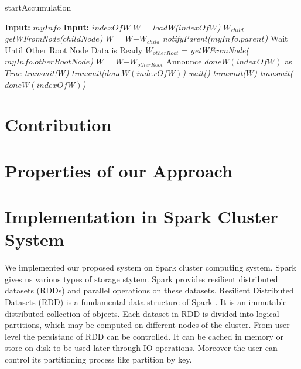 \documentclass[10pt,conference,letterpaper]{IEEEtran}
\begin{document}
\begin{algorithm} [!htbp]
\label{accum}
\caption{startAccumulation}
	\begin{algorithmic}[1]
	\State \textbf{Input:} $myInfo$
	\State \textbf{Input:} $indexOfW$
	\State $W$ = \textit{loadW($indexOfW$)} 
			\State  $W_{child}$ = \textit{getWFromNode($childNode$)}
			\State $W$ = $W$+$W_{child}$
		\EndIf
	\EndFor
	\State \textit{notifyParent($myInfo.parent$)}
		\State Wait Until Other Root Node Data is Ready
		\State  $W_{otherRoot}$ = \textit{getWFromNode($myInfo.otherRootNode$)}
		\State $W$ = $W$+$W_{otherRoot}$
		\State Announce $doneW(indexOfW)$ as $True$
			\State \textit{transmit($W$)}
			\State \textit{transmit($doneW(indexOfW)$)}
		\EndFor
	\Else
			\State \textit{wait()}
		\EndWhile
			\State \textit{transmit($W$)}
			\State \textit{transmit($doneW(indexOfW)$)}
		\EndFor
	\EndIf
	
	\end{algorithmic}
\end{algorithm}


\newpage

\section{Contribution}

\section{Properties of our Approach}

\section{Implementation in Spark Cluster System}
We implemented our proposed system on Spark \cite{spark} cluster computing system. Spark gives us various types of storage stytem. Spark provides resilient distributed datasets (RDDs) and parallel operations on these datasets. Resilient Distributed Datasets (RDD) is a fundamental data structure of Spark \cite{spark-site}. It is an immutable distributed collection of objects. Each dataset in RDD is divided into logical partitions, which may be computed on different nodes of the cluster. From user level the persistanc of RDD can be controlled. It can be cached in memory or store on disk to be used later through IO operations. Moreover the user can control its partitioning process like partition by key.
\end{document}
